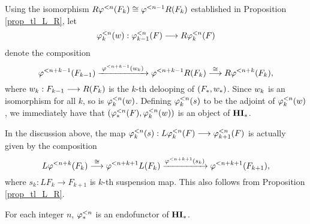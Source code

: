 Using the isomorphism $R\tlHI{n}(F_k) \cong \tlHI{n - 1}R(F_k)$ 
established in Proposition \ref{prop_tl_L_R}, let
\[
\deloopTL[k]{n} : \tlHM[k - 1]{n}(F) \to R \tlHM[k]{n}(F) 
\]
denote the composition
\begin{equation}\label{eq_deloop_def}
\tlHI{n + k - 1}(F_{k - 1})
   \xrightarrow{\;\tlHI{n + k - 1}(\deloop_k)\;} 
   \tlHI{n + k - 1} R(F_k) \stackrel{\cong}{\to} 
   R \tlHI{n + k}(F_k),
\end{equation}
where $\deloop_k: F_{k - 1} \to R(F_k)$ is the $k$-th delooping
of $(F_*, \deloop_*)$. Since $\deloop_k$ is an isomorphism 
for all $k$, so is $\deloopTL[k]{n}$. Defining $\suspTL[k]{n}$
to be the adjoint of $\deloopTL[k]{n}$, we immediately have that
$(\tlHM{n}(F), \deloopTL[k]{n})$ is an object of $\HM$. 

\begin{rmk*}
In the discussion above, the map $\suspTL[k]{n}: L\tlHM[k]{n}(F) \to
\tlHM[k + 1]{n}(F)$ is actually given by the composition
\[
L \tlHI{n + k}(F_{k}) \stackrel{\cong}{\to}
\tlHI{n + k + 1}L(F_{k}) \xrightarrow{\tlHI{n + k + 1}(s_k)}
\tlHI{n + k + 1}(F_{k + 1}),
\]
where $s_k: LF_k \to F_{k + 1}$ is $k$-th suspension map. This also
follows from Proposition \ref{prop_tl_L_R}.
\end{rmk*}

\begin{lem}\label{lem_tlHM_is_functor}
For each integer $n$, $\tlHM{n}$ is an endofunctor of $\HM$.
\end{lem}

